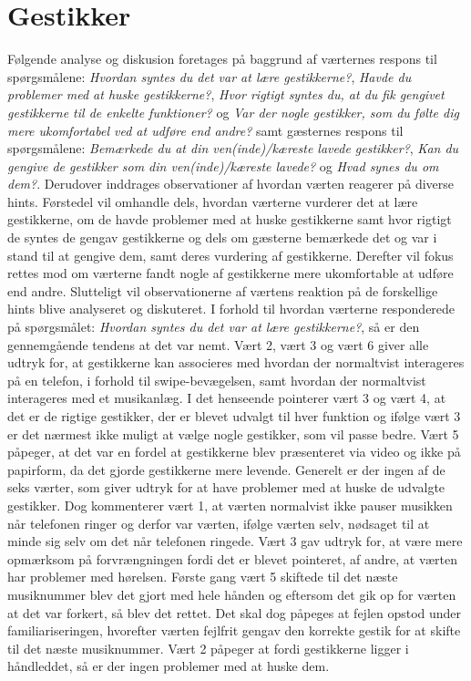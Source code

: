\section{Gestikker}
\label{TestresultaterSocialAcceptGestikker}
%
Følgende analyse og diskusion foretages på baggrund af værternes respons til spørgsmålene: \textit{Hvordan syntes du det var at lære gestikkerne?}, \textit{Havde du problemer med at huske gestikkerne?}, \textit{Hvor rigtigt syntes du, at du fik gengivet gestikkerne til de enkelte funktioner?} og \textit{Var der nogle gestikker, som du følte dig mere ukomfortabel ved at udføre end andre?} samt gæsternes respons til spørgsmålene: \textit{Bemærkede du at din ven(inde)/kæreste lavede gestikker?}, \textit{Kan du gengive de gestikker som din ven(inde)/kæreste lavede?} og \textit{Hvad synes du om dem?}. Derudover inddrages observationer af hvordan værten reagerer på diverse hints. Førstedel vil omhandle dels, hvordan værterne vurderer det at lære gestikkerne, om de havde problemer med at huske gestikkerne samt hvor rigtigt de syntes de gengav gestikkerne og dels om gæsterne bemærkede det og var i stand til at gengive dem, samt deres vurdering af gestikkerne. Derefter vil fokus rettes mod om værterne fandt nogle af gestikkerne mere ukomfortable at udføre end andre. Slutteligt vil observationerne af værtens reaktion på de forskellige hints blive analyseret og diskuteret. \blankline
%
I forhold til hvordan værterne responderede på spørgsmålet: \textit{Hvordan syntes du det var at lære gestikkerne?}, så er den gennemgående tendens at det var nemt. Vært 2, vært 3 og vært 6 giver alle udtryk for, at gestikkerne kan associeres med hvordan der normaltvist interageres på en telefon, i forhold til swipe-bevægelsen, samt hvordan der normaltvist interageres med et musikanlæg. I det henseende pointerer vært 3 og vært 4, at det er de rigtige gestikker, der er blevet udvalgt til hver funktion og ifølge vært 3 er det nærmest ikke muligt at vælge nogle gestikker, som vil passe bedre. Vært 5 påpeger, at det var en fordel at gestikkerne blev præsenteret via video og ikke på papirform, da det gjorde gestikkerne mere levende. Generelt er der ingen af de seks værter, som giver udtryk for at have problemer med at huske de udvalgte gestikker. Dog kommenterer vært 1, at værten normalvist ikke pauser musikken når telefonen ringer og derfor var værten, ifølge værten selv, nødsaget til at minde sig selv om det når telefonen ringede. Vært 3 gav udtryk for, at være mere opmærksom på forvrængningen fordi det er blevet pointeret, af andre, at værten har problemer med hørelsen. Første gang vært 5 skiftede til det næste musiknummer blev det gjort med hele hånden og eftersom det gik op for værten at det var forkert, så blev det rettet. Det skal dog påpeges at fejlen opstod under familiariseringen, hvorefter værten fejlfrit gengav den korrekte gestik for at skifte til det næste musiknummer. Vært 2 påpeger at fordi gestikkerne ligger i håndleddet, så er der ingen problemer med at huske dem. 

